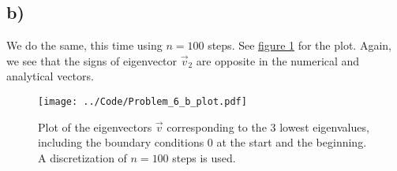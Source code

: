 \documentclass[english,notitlepage]{article}  %
\begin{document}
\subsection*{b)}

We do the same, this time using $n=100$ steps. See \hyperref[fig:6bplot]{figure \ref*{fig:6bplot}} for the plot. Again, we see that the signs of eigenvector $\vec{v}_2$ are opposite in the numerical and analytical vectors.

\begin{figure}[H]
    \centering
    \texttt{[image: ../Code/Problem\_6\_b\_plot.pdf]}
    \caption{Plot of the eigenvectors $\vec{v}$ corresponding to the 3 lowest eigenvalues, including the boundary conditions 0 at the start and the beginning. A discretization of $n=100$ steps is used.}
    \label{fig:6bplot}
\end{figure}
\end{document}
